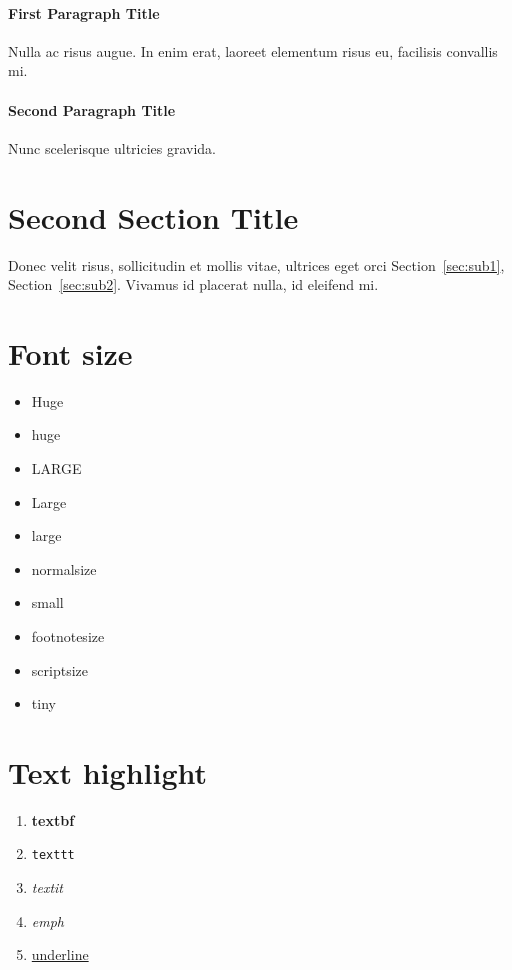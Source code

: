 \paragraph{First Paragraph Title}\label{sec:p1}

Nulla ac risus augue. In enim erat, laoreet elementum risus eu, facilisis convallis mi.

\paragraph{Second Paragraph Title}\label{sec:p2}

Nunc scelerisque ultricies gravida.

\section{Second Section Title}\label{sec:s2}

Donec velit risus, sollicitudin et mollis vitae, ultrices eget orci Section~\ref{sec:sub1}, Section~\ref{sec:sub2}. Vivamus id placerat nulla, id eleifend mi.

\section{Font size}\label{sec:font_size}

\begin{itemize}
    \item {\Huge Huge}
    \item {\huge huge}
    \item {\LARGE LARGE}
    \item {\Large Large}
    \item {\large large}
    \item {\normalsize normalsize}
    \item {\small small}
    \item {\footnotesize footnotesize}
    \item {\scriptsize scriptsize}
    \item {\tiny tiny}
\end{itemize}

\section{Text highlight}

\begin{enumerate}
    \item {\textbf{textbf}}
    \item {\texttt{texttt}}
    \item {\textit{textit}}
    \item {\emph{emph}}
    \item {\underline{underline}}
\end{enumerate}

